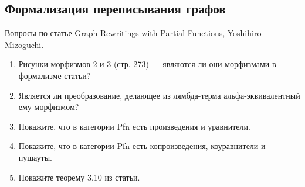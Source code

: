 \documentclass[10pt]{article}
\theoremstyle{definition}
\begin{document}
\subsection{Формализация переписывания графов}

Вопросы по статье Graph Rewritings with Partial Functions, Yoshihiro Mizoguchi.
\begin{enumerate}
\item Рисунки морфизмов 2 и 3 (стр. 273) --- являются ли они морфизмами в формализме статьи?
\item Является ли преобразование, делающее из лямбда-терма альфа-эквивалентный ему морфизмом?
\item Покажите, что в категории Pfn есть произведения и уравнители.
\item Покажите, что в категории Pfn есть копроизведения, коуравнители и пушауты.
\item Покажите теорему 3.10 из статьи.
\end{enumerate}
\end{document}
